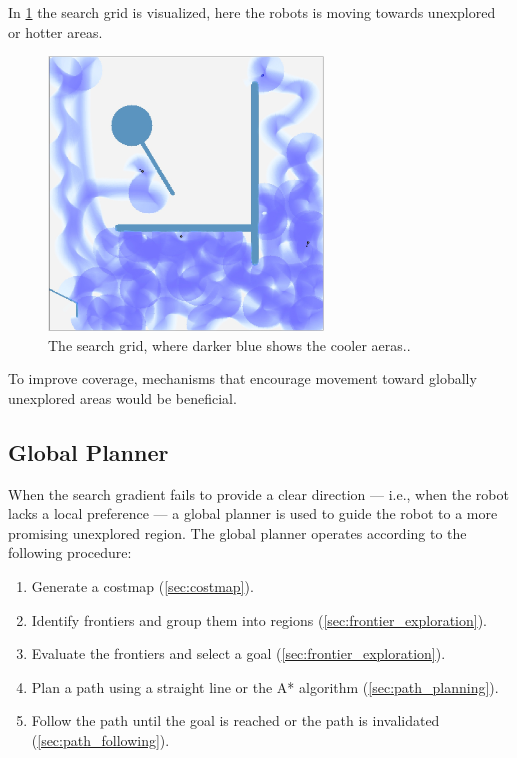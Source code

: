 In \cref{fig:gradient-forward-bias} the search grid is visualized, here the robots is moving towards unexplored or hotter areas.
\begin{figure}[H]
  \centering
  \includegraphics[width=0.65\textwidth]{./figures/screenshots/with-forward.jpeg}
  \caption{The search grid, where darker blue shows the cooler aeras..}
  \label{fig:gradient-forward-bias}
\end{figure}

To improve coverage, mechanisms that encourage movement toward globally unexplored areas would be beneficial.

\subsection{Global Planner}
When the search gradient fails to provide a clear direction --- i.e., when the robot lacks a local preference --- a global planner is used to guide the robot to a more promising unexplored region. The global planner operates according to the following procedure:

\begin{enumerate}
  \item Generate a costmap (\cref{sec:costmap}).
  \item Identify frontiers and group them into regions \cite{frontier-exploration} (\cref{sec:frontier_exploration}).
  \item Evaluate the frontiers and select a goal (\cref{sec:frontier_exploration}).
  \item Plan a path using a straight line or the A* algorithm \cite{a-star} (\cref{sec:path_planning}).
  \item Follow the path until the goal is reached or the path is invalidated (\cref{sec:path_following}).
\end{enumerate}
 
